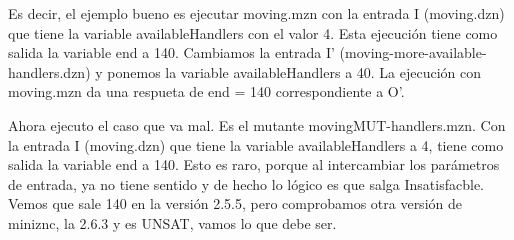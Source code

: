Es decir, el ejemplo bueno es ejecutar moving.mzn con la entrada I (moving.dzn) que tiene la variable  availableHandlers con el valor 4. Esta ejecución tiene como salida la variable end a 140. Cambiamos la entrada I' (moving-more-available-handlers.dzn) y ponemos la variable availableHandlers a 40. La ejecución con moving.mzn da una respueta de end = 140 correspondiente a O'.

Ahora ejecuto el caso que va mal. Es el mutante movingMUT-handlers.mzn. Con la entrada I (moving.dzn) que tiene la variable  availableHandlers a 4, tiene como salida la variable end a 140. Esto es raro, porque al intercambiar los parámetros de entrada, ya no tiene sentido y de hecho lo lógico es que salga Insatisfacble. Vemos que sale 140 en la versión 2.5.5, pero comprobamos otra versión de miniznc, la 2.6.3 y es UNSAT, vamos lo que debe ser.

